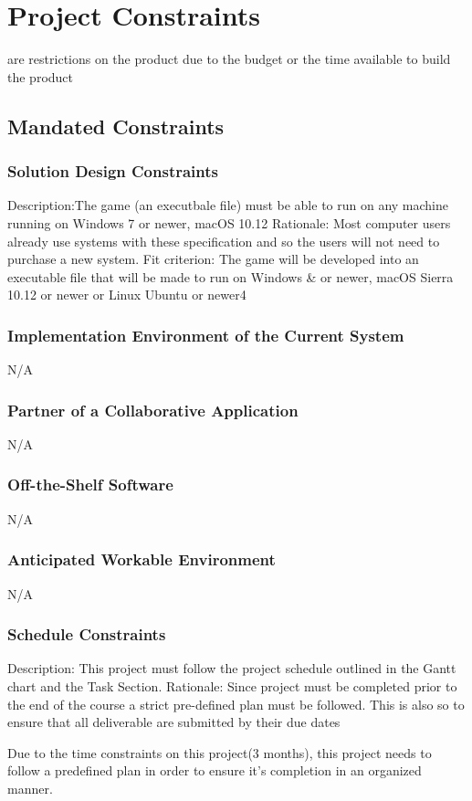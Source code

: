 \documentclass{article}
\begin{document}
\section{Project Constraints}
are restrictions on the product due to the budget or the 
time available to build the product
    \subsection{Mandated Constraints}
    \subsubsection{Solution Design Constraints}
    Description:The game (an executbale file) must be able to run on any machine running on Windows 7 or newer, macOS 10.12 
    Rationale: Most computer users already use systems with these specification and so the users will not need to purchase a new system.
    Fit criterion: The game will be developed into an executable file that will be made to run on Windows & or newer, macOS Sierra 10.12 or newer or Linux Ubuntu or newer4
\subsubsection{Implementation Environment of the Current System}
N/A
\subsubsection{Partner of a Collaborative Application}
N/A
\subsubsection{Off-the-Shelf Software}
N/A
\subsubsection{Anticipated Workable Environment}
N/A
\subsubsection{Schedule Constraints}
Description: This project must follow the project schedule outlined in the Gantt chart and the Task Section.
Rationale: Since project must be completed prior to the end of the course a strict pre-defined plan must be followed. This is also so to ensure that all deliverable are submitted by their due dates

Due to the time constraints on this project(3 months), this project needs to follow a predefined plan in order to ensure it's completion in an organized manner.
\end{document}
